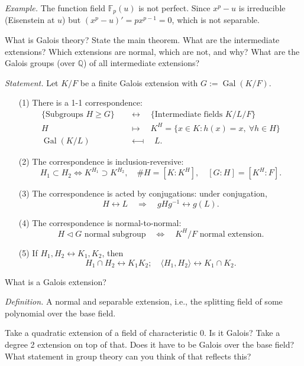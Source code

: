 \documentclass{mathproblems}
\newcommand\Q{\mathbb{Q}}
\newcommand\F{\mathbb{F}}
\DeclareMathOperator{\Gal}{Gal}
\begin{document}
\begin{questions}
\textit{Example.}
The function field $\F_p(u)$ is not perfect. Since $x^p-u$ is irreducible (Eisenstein at $u$) but $(x^p-u)'=p x^{p-1}=0$, which is not separable.

\miquestion
{\color{blue} What is Galois theory? State the main theorem. What are the intermediate extensions? Which extensions are normal, which are not, and why? What are the Galois groups (over $\Q$) of all intermediate extensions?}

{\color{violet}
\textit{Statement.} Let $K/F$ be a finite Galois extension with $G:=\Gal(K/F)$.
\begin{itemize}
\item[(1)] There is a 1-1 correspondence:
$$
\begin{aligned}
\{\text{Subgroups } H\geqslant G\} & \quad \longleftrightarrow \quad \{\text{Intermediate fields } K/L/F\} \\
H & \quad\longmapsto\quad K^H=\{x\in K: h(x)=x, \ \forall h\in H\}\\
\Gal(K/L) & \quad\longmapsfrom\quad L.
\end{aligned}
$$
\item[(2)] The correspondence is inclusion-reversive: $$
H_1\subset H_2 \Longleftrightarrow K^{H_1}\supset K^{H_2},\quad \# H=[K:K^H], \quad [G:H]=[K^H:F].
$$
\item[(3)] The correspondence is acted by conjugations: under conjugation,
$$
H \longleftrightarrow L \quad \Longrightarrow \quad g H g^{-1}\longleftrightarrow g(L).
$$
\item[(4)] The correspondence is normal-to-normal:
$$
H \triangleleft G \text{ normal subgroup} \quad \Longleftrightarrow \quad K^H/F \text{ normal extension}.
$$
\item[(5)] If $H_1,H_2\leftrightarrow K_1,K_2$, then
$$
H_1\cap H_2 \longleftrightarrow K_1K_2; \quad \langle H_1, H_2 \rangle \longleftrightarrow K_1\cap K_2.
$$

\end{itemize}
}

\miquestion
{\color{blue} What is a Galois extension?}

\textit{Definition.} A normal and separable extension, i.e., the splitting field of some polynomial over the base field.

\miquestion
{\color{blue} Take a quadratic extension of a field of characteristic 0. Is it Galois? Take a degree 2 extension on top of that. Does it have to be Galois over the base field? What statement in group theory can you think of that reflects this?}


\end{questions}
\end{document}
